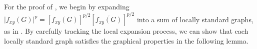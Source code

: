 For the proof of , we begin by expanding $\big|f_{xy}(G)\big|^{p} = [f_{xy}(G)]^{p/2}[\overline{f_{xy}(G)}]^{p/2}$ into a sum of locally standard graphs, as in . By carefully tracking the local expansion process, we can show that each locally standard graph satisfies the graphical properties in the following lemma.  






